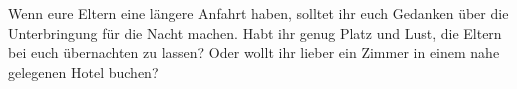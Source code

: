 \begin{multicols}{2}
Wenn eure Eltern eine längere Anfahrt haben, solltet ihr euch Gedanken über die Unterbringung für die Nacht machen.
Habt ihr genug Platz und Lust, die Eltern bei euch übernachten zu lassen? Oder wollt ihr lieber ein Zimmer in einem nahe gelegenen Hotel buchen?

\end{multicols}

\begin{center}
\end{center}

